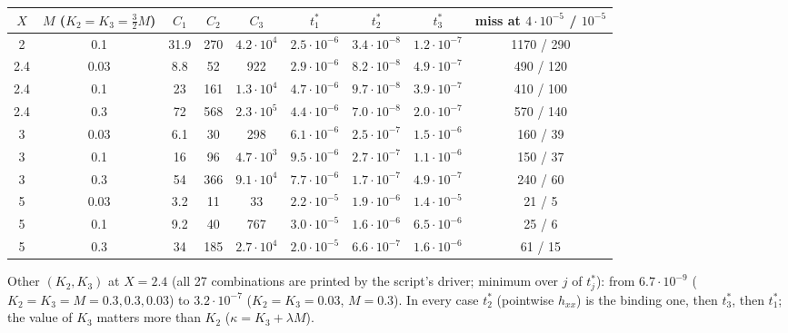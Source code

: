 \documentclass[11pt]{article}
\theoremstyle{remark}\newtheorem{remark}[theorem]{Remark}
\begin{document}
\begin{table}[h]\centering\small
\begin{tabular}{cc cccc ccc}\toprule
$X$ & $M$ ($K_2=K_3=\tfrac32M$) & $C_1$ & $C_2$ & $C_3$ & $t_1^*$ & $t_2^*$ & $t_3^*$ & miss at $4\!\cdot\!10^{-5}$ / $10^{-5}$\\\midrule
2 & 0.1 & 31.9 & 270 & $4.2\!\cdot\!10^4$ & $2.5\!\cdot\!10^{-6}$ & $3.4\!\cdot\!10^{-8}$ & $1.2\!\cdot\!10^{-7}$ & 1170 / 290\\
2.4& 0.03& 8.8 & 52 & 922 & $2.9\!\cdot\!10^{-6}$ & $8.2\!\cdot\!10^{-8}$ & $4.9\!\cdot\!10^{-7}$ & 490 / 120\\
2.4& 0.1 & 23 & 161 & $1.3\!\cdot\!10^4$ & $4.7\!\cdot\!10^{-6}$ & $9.7\!\cdot\!10^{-8}$ & $3.9\!\cdot\!10^{-7}$ & 410 / 100\\
2.4& 0.3 & 72 & 568 & $2.3\!\cdot\!10^5$ & $4.4\!\cdot\!10^{-6}$ & $7.0\!\cdot\!10^{-8}$ & $2.0\!\cdot\!10^{-7}$ & 570 / 140\\
3 & 0.03& 6.1 & 30 & 298 & $6.1\!\cdot\!10^{-6}$ & $2.5\!\cdot\!10^{-7}$ & $1.5\!\cdot\!10^{-6}$ & 160 / 39\\
3 & 0.1 & 16 & 96 & $4.7\!\cdot\!10^3$ & $9.5\!\cdot\!10^{-6}$ & $2.7\!\cdot\!10^{-7}$ & $1.1\!\cdot\!10^{-6}$ & 150 / 37\\
3 & 0.3 & 54 & 366 & $9.1\!\cdot\!10^4$ & $7.7\!\cdot\!10^{-6}$ & $1.7\!\cdot\!10^{-7}$ & $4.9\!\cdot\!10^{-7}$ & 240 / 60\\
5 & 0.03& 3.2 & 11 & 33 & $2.2\!\cdot\!10^{-5}$ & $1.9\!\cdot\!10^{-6}$ & $1.4\!\cdot\!10^{-5}$ & 21 / 5\\
5 & 0.1 & 9.2 & 40 & 767 & $3.0\!\cdot\!10^{-5}$ & $1.6\!\cdot\!10^{-6}$ & $6.5\!\cdot\!10^{-6}$ & 25 / 6\\
5 & 0.3 & 34 & 185 & $2.7\!\cdot\!10^4$ & $2.0\!\cdot\!10^{-5}$ & $6.6\!\cdot\!10^{-7}$ & $1.6\!\cdot\!10^{-6}$ & 61 / 15\\\bottomrule
\end{tabular}\end{table}
Other $(K_2,K_3)$ at $X=2.4$ (all 27 combinations are printed by the script's driver; minimum over $j$ of $t_j^*$): from $6.7\cdot10^{-9}$ ($K_2=K_3=M{=}0.3,0.3,0.03$) to $3.2\cdot10^{-7}$ ($K_2=K_3=0.03$, $M=0.3$). In every case $t_2^*$ (pointwise $h_{xx}$) is the binding one, then $t_3^*$, then $t_1^*$; the value of $K_3$ matters more than $K_2$ ($\kappa=K_3+\lambda M$).
\end{document}
